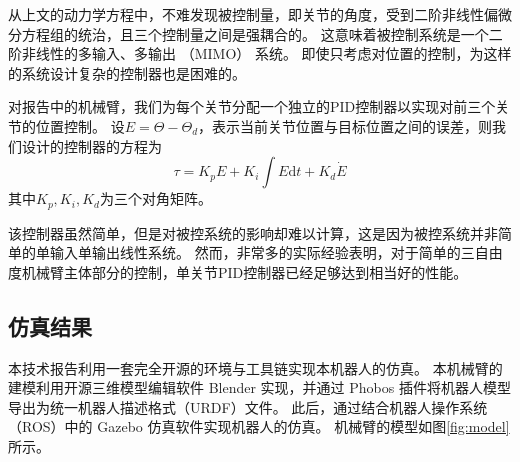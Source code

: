 \documentclass{ctexart}
\begin{document}
从上文的动力学方程中，不难发现被控制量，即关节的角度，受到二阶非线性偏微分方程组的统治，且三个控制量之间是强耦合的。
这意味着被控制系统是一个二阶非线性的多输入、多输出 （MIMO） 系统。
即使只考虑对位置的控制，为这样的系统设计复杂的控制器也是困难的。

对报告中的机械臂，我们为每个关节分配一个独立的PID控制器以实现对前三个关节的位置控制。
设$E = \Theta - \Theta_d$，表示当前关节位置与目标位置之间的误差，则我们设计的控制器的方程为
\[
    \tau = K_p E + K_i \int E \mathrm d t + K_d \dot E
\]
其中$K_p, K_i, K_d$为三个对角矩阵。

该控制器虽然简单，但是对被控系统的影响却难以计算，这是因为被控系统并非简单的单输入单输出线性系统。
然而，非常多的实际经验表明，对于简单的三自由度机械臂主体部分的控制，单关节PID控制器已经足够达到相当好的性能。

\subsection{仿真结果}

本技术报告利用一套完全开源的环境与工具链实现本机器人的仿真。
本机械臂的建模利用开源三维模型编辑软件 Blender 实现，并通过 Phobos 插件将机器人模型导出为统一机器人描述格式（URDF）文件。
此后，通过结合机器人操作系统（ROS）中的 Gazebo 仿真软件实现机器人的仿真。
机械臂的模型如图\ref{fig:model}所示。
\end{document}
